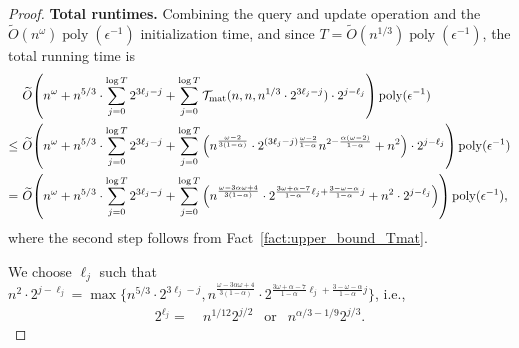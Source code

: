 \documentclass[11pt]{article}
\newcommand{\Tmat}{\mathcal{T}_{\mathrm{mat}}}
\let\originalleft\left
\let\originalright\right
\renewcommand{\left}{\mathopen{}\mathclose\bgroup\originalleft}
\renewcommand{\right}{\aftergroup\egroup\originalright}
\newcommand{\wt}{\widetilde}
\DeclareMathOperator*{\poly}{{\mathrm{poly}}}
\begin{document}
\begin{proof}
{\bf Total runtimes.} Combining the query and update operation and the $\wt{O}(n^{\omega}) \poly(\epsilon^{-1})$ initialization time, and since $T = \wt{O}(n^{1/3}) \poly(\epsilon^{-1})$, the total running time is
\begin{align*}
&~ \wt{O}\left(n^{\omega} + n^{5/3} \cdot \sum_{j=0}^{\log T} 2^{3 \ell_j - j} + \sum_{j=0}^{\log T} \Tmat(n,n, n^{1/3} \cdot 2^{3 \ell_j - j}) \cdot 2^{j - \ell_j}\right) \poly(\epsilon^{-1}) \\
\leq &~ \wt{O}\left(n^{\omega} + n^{5/3} \cdot \sum_{j=0}^{\log T} 2^{3 \ell_j - j} + \sum_{j=0}^{\log T} \Big( n^{\frac{\omega-2}{3(1-\alpha)}} \cdot 2^{(3 \ell_j - j)\frac{\omega-2}{1-\alpha}} n^{2-\frac{\alpha(\omega-2)}{1-\alpha}} + n^2 \Big)\cdot 2^{j - \ell_j} \right) \poly(\epsilon^{-1}) \\
= &~ \wt{O}\left(n^{\omega} + n^{5/3} \cdot \sum_{j=0}^{\log T} 2^{3 \ell_j - j} + \sum_{j=0}^{\log T} \Big( n^{\frac{\omega - 3 \alpha \omega + 4}{3(1-\alpha)}} \cdot 2^{\frac{3\omega+\alpha-7}{1-\alpha} \ell_j + \frac{3-\omega-\alpha}{1-\alpha} j} + n^2 \cdot 2^{j-\ell_j}\Big)\right) \poly(\epsilon^{-1}),
\end{align*}
where the second step follows from Fact~\ref{fact:upper_bound_Tmat}.


We choose $\ell_j$ such that $n^2 \cdot 2^{j-\ell_j} = \max\{n^{5/3} \cdot 2^{3 \ell_j - j}, n^{\frac{\omega - 3 \alpha \omega + 4}{3(1-\alpha)}} \cdot 2^{\frac{3\omega+\alpha-7}{1-\alpha} \ell_j + \frac{3-\omega-\alpha}{1-\alpha} j}\}$, i.e.,
\begin{align*}
2^{\ell_j} = &~ n^{1/12} 2^{j/2} ~~\text{ or } ~~ n^{\alpha/3-1/9} 2^{j/3}. 
\end{align*}


\end{proof}
\end{document}
